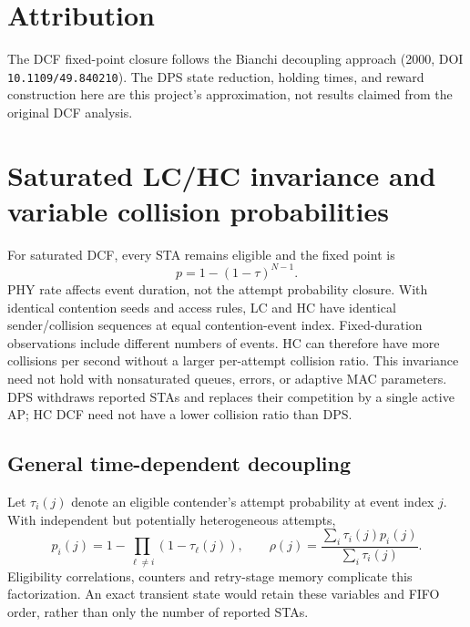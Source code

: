 \documentclass[11pt,a4paper]{article}
\begin{document}
\section*{Attribution}
The DCF fixed-point closure follows the Bianchi decoupling approach
(2000, DOI \texttt{10.1109/49.840210}). The DPS state reduction, holding times,
and reward construction here are this project's approximation, not results
claimed from the original DCF analysis.

\section{Saturated LC/HC invariance and variable collision probabilities}
For saturated DCF, every STA remains eligible and the fixed point is
\begin{equation}
p=1-(1-\tau)^{N-1}.
\end{equation}
PHY rate affects event duration, not the attempt probability closure.
With identical contention seeds and access rules, LC and HC have identical
sender/collision sequences at equal contention-event index. Fixed-duration
observations include different numbers of events. HC can therefore have
more collisions per second without a larger per-attempt collision ratio.
This invariance need not hold with nonsaturated queues, errors, or adaptive
MAC parameters. DPS withdraws reported STAs and replaces their competition
by a single active AP; HC DCF need not have a lower collision ratio than DPS.

\subsection{General time-dependent decoupling}
Let $\tau_i(j)$ denote an eligible contender's attempt probability at event
index $j$. With independent but potentially heterogeneous attempts,
\begin{equation}
p_i(j)=1-\prod_{\ell\ne i}(1-\tau_\ell(j)),\qquad
\rho(j)=\frac{\sum_i\tau_i(j)p_i(j)}{\sum_i\tau_i(j)}.
\end{equation}
Eligibility correlations, counters and retry-stage memory complicate this
factorization. An exact transient state would retain these variables and
FIFO order, rather than only the number of reported STAs.
\end{document}
